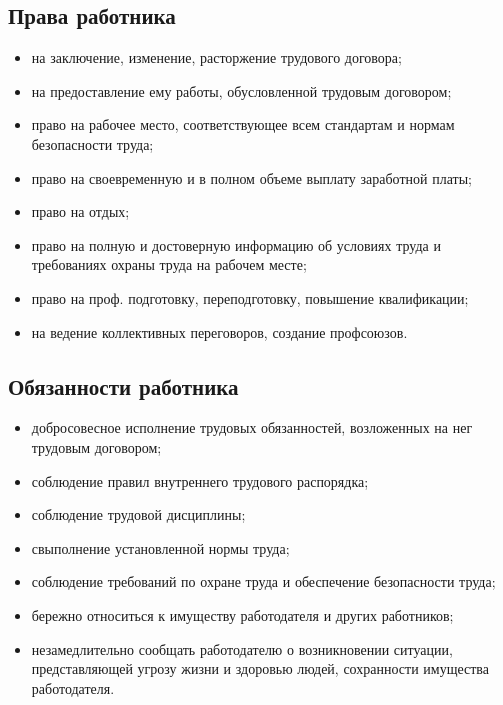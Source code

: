 \documentclass[a5paper,10pt]{article}
\begin{document}
		\subsection{Права работника}
			\begin{itemize}[itemsep=0pt]
				\item на заключение, изменение, расторжение трудового договора;
				\item на предоставление ему работы, обусловленной трудовым договором;
				\item право на рабочее место, соответствующее всем стандартам и нормам безопасности труда;
				\item право на своевременную и в полном объеме выплату заработной платы;
				\item право на отдых;
				\item право на полную и достоверную информацию об условиях труда и требованиях охраны труда на рабочем месте;
				\item право на проф. подготовку, переподготовку, повышение квалификации;
				\item на ведение коллективных переговоров, создание профсоюзов.
			\end{itemize}

		\subsection{Обязанности работника}
			\begin{itemize}[itemsep=0pt]
				\item добросовесное исполнение трудовых обязанностей, возложенных на нег трудовым договором;
				\item соблюдение правил внутреннего трудового распорядка;
				\item соблюдение трудовой дисциплины;
				\item свыполнение установленной нормы труда;
				\item соблюдение требований по охране труда и обеспечение безопасности труда;
				\item бережно относиться к имуществу работодателя и других работников;
				\item незамедлительно сообщать работодателю о возникновении ситуации, представляющей угрозу жизни и здоровью людей, сохранности имущества работодателя.
			\end{itemize}
\end{document}
